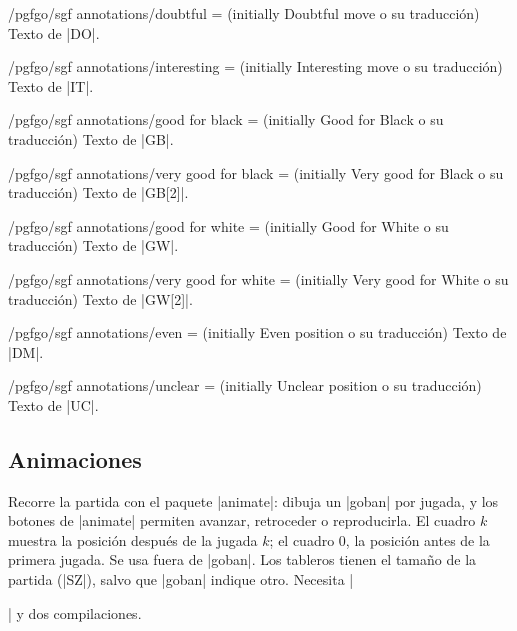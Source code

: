 \begin{key}{/pgfgo/sgf annotations/doubtful =  (initially Doubtful move o su traducción)}
	Texto de |DO|.
\end{key}

\begin{key}{/pgfgo/sgf annotations/interesting =  (initially Interesting move o su traducción)}
	Texto de |IT|.
\end{key}

\begin{key}{/pgfgo/sgf annotations/good for black =  (initially Good for Black o su traducción)}
	Texto de |GB|.
\end{key}

\begin{key}{/pgfgo/sgf annotations/very good for black =  (initially Very good for Black o su traducción)}
	Texto de |GB[2]|.
\end{key}

\begin{key}{/pgfgo/sgf annotations/good for white =  (initially Good for White o su traducción)}
	Texto de |GW|.
\end{key}

\begin{key}{/pgfgo/sgf annotations/very good for white =  (initially Very good for White o su traducción)}
	Texto de |GW[2]|.
\end{key}

\begin{key}{/pgfgo/sgf annotations/even =  (initially Even position o su traducción)}
	Texto de |DM|.
\end{key}

\begin{key}{/pgfgo/sgf annotations/unclear =  (initially Unclear position o su traducción)}
	Texto de |UC|.
\end{key}

\subsection{Animaciones}
\label{subsec:sgfanimacion}

\begin{command}{\sgfanimation{}}

	Recorre la partida con el paquete |animate|: dibuja un |goban| por jugada, y los botones de |animate| permiten avanzar, retroceder o reproducirla. El cuadro $k$ muestra la posición después de la jugada $k$; el cuadro 0, la posición antes de la primera jugada. Se usa fuera de |goban|. Los tableros tienen el tamaño de la partida (|SZ|), salvo que |goban| indique otro. Necesita |\usepackage{animate}| y dos compilaciones.
\end{command}

